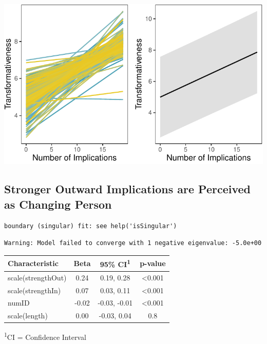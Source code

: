 \documentclass[
  .7em,
  letterpaper,
  DIV=11,
  numbers=noendperiod]{scrartcl}
\begin{document}
\includegraphics{EpMemNet_LabPres_htmldoc_files/figure-pdf/unnamed-chunk-26-1.pdf}

\hypertarget{stronger-outward-implications-are-perceived-as-changing-person}{%
\subsection{Stronger Outward Implications are Perceived as Changing
Person}\label{stronger-outward-implications-are-perceived-as-changing-person}}

\begin{verbatim}
boundary (singular) fit: see help('isSingular')
\end{verbatim}

\begin{verbatim}
Warning: Model failed to converge with 1 negative eigenvalue: -5.0e+00
\end{verbatim}

\captionsetup[table]{labelformat=empty,skip=1pt}
\setlength{\LTpost}{0mm}
\begin{longtable}{lccc}
\toprule
\textbf{Characteristic} & \textbf{Beta} & \textbf{95\% CI}\textsuperscript{1} & \textbf{p-value} \\ 
\midrule
scale(strengthOut) & 0.24 & 0.19, 0.28 & <0.001 \\ 
scale(strengthIn) & 0.07 & 0.03, 0.11 & <0.001 \\ 
numID & -0.02 & -0.03, -0.01 & <0.001 \\ 
scale(length) & 0.00 & -0.03, 0.04 & 0.8 \\ 
\bottomrule
\end{longtable}
\begin{minipage}{\linewidth}
\textsuperscript{1}CI = Confidence Interval\\
\end{minipage}
\end{document}
